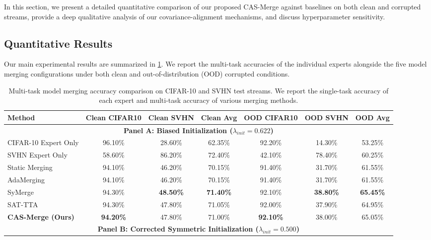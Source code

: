 \documentclass{article}
\begin{document}
In this section, we present a detailed quantitative comparison of our proposed CAS-Merge against baselines on both clean and corrupted streams, provide a deep qualitative analysis of our covariance-alignment mechanisms, and discuss hyperparameter sensitivity.

\subsection{Quantitative Results}
Our main experimental results are summarized in \cref{tab:results}. We report the multi-task accuracies of the individual experts alongside the five model merging configurations under both clean and out-of-distribution (OOD) corrupted conditions.

\begin{table}[t]
\caption{Multi-task model merging accuracy comparison on CIFAR-10 and SVHN test streams. We report the single-task accuracy of each expert and multi-task accuracy of various merging methods.}
\label{tab:results}
\vskip 0.15in
\begin{center}
\begin{small}
\begin{sc}
\setlength{\tabcolsep}{4.5pt}
\begin{tabular}{lcccccc}
\toprule
Method & Clean CIFAR10 & Clean SVHN & Clean Avg & OOD CIFAR10 & OOD SVHN & OOD Avg \\
\midrule
\multicolumn{7}{c}{\textbf{Panel A: Biased Initialization ($\lambda_{init} = 0.622$)}} \\
\midrule
CIFAR-10 Expert Only & 96.10\% & 28.60\% & 62.35\% & 92.20\% & 14.30\% & 53.25\% \\
SVHN Expert Only     & 58.60\% & 86.20\% & 72.40\% & 42.10\% & 78.40\% & 60.25\% \\
\midrule
Static Merging       & 94.10\% & 46.20\% & 70.15\% & 91.40\% & 31.70\% & 61.55\% \\
AdaMerging           & 94.10\% & 46.20\% & 70.15\% & 91.40\% & 31.70\% & 61.55\% \\
SyMerge              & 94.30\% & \textbf{48.50\%} & \textbf{71.40\%} & 92.10\% & \textbf{38.80\%} & \textbf{65.45\%} \\
SAT-TTA              & 94.30\% & 47.80\% & 71.05\% & 92.00\% & 37.90\% & 64.95\% \\
\textbf{CAS-Merge (Ours)} & \textbf{94.20\%} & 47.80\% & 71.00\% & \textbf{92.10\%} & 38.00\% & 65.05\% \\
\midrule
\multicolumn{7}{c}{\textbf{Panel B: Corrected Symmetric Initialization ($\lambda_{init} = 0.500$)}} \\

\end{tabular}
\end{sc}
\end{small}
\end{center}
\end{table}
\end{document}
